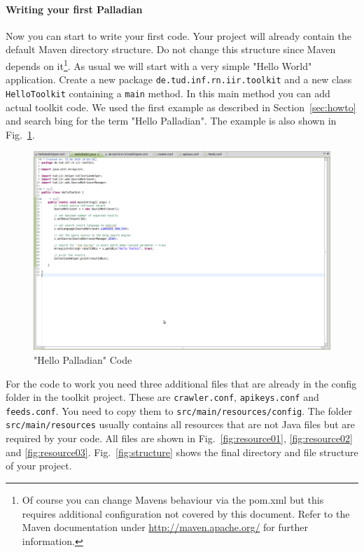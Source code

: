 \documentclass[a4paper,twoside]{book}      %
\begin{document}
\paragraph{Writing your first Palladian} Now you can start to write your first code. Your project will already contain the default Maven directory structure. Do not change this structure since Maven depends on it\footnote{Of course you can change Mavens behaviour via the pom.xml but this requires additional configuration not covered by this document. Refer to the Maven documentation under \url{http://maven.apache.org/} for further information.}. As usual we will start with a very simple "Hello World" application. Create a new package \texttt{de.tud.inf.rn.iir.toolkit} and a new class \texttt{HelloToolkit} containing a \texttt{main} method. In this main method you can add actual toolkit code. We used the first example as described in Section~\ref{sec:howto} and search bing for the term "Hello Palladian". The example is also shown in Fig.~\ref{fig:hellotoolkit}.
\begin{figure}
\centering
\includegraphics[trim=0 350px 600px 0,clip=true,width=\textwidth]{img/ht10.png}
\caption{"Hello Palladian" Code}
\label{fig:hellotoolkit}
\end{figure}
For the code to work you need three additional files that are already in the config folder in the toolkit project. These are \texttt{crawler.conf}, \texttt{apikeys.conf} and \texttt{feeds.conf}. You need to copy them to \texttt{src/main/resources/config}. The folder \texttt{src/main/resources} usually contains all resources that are not Java files but are required by your code. All files are shown in Fig.~\ref{fig:resource01}, \ref{fig:resource02} and \ref{fig:resource03}. Fig.~\ref{fig:structure} shows the final directory and file structure of your project.
\end{document}
